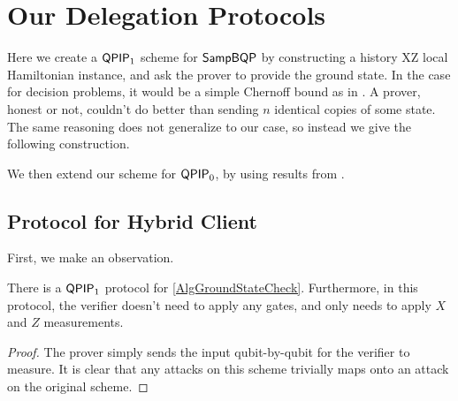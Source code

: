 \section{Our Delegation Protocols}

Here we create a $\operatorname{\mathsf{QPIP}}_1$ scheme for $\operatorname{\mathsf{SampBQP}}$ by constructing a history XZ local Hamiltonian instance, and ask the prover to provide the ground state. In the case for decision problems, it would be a simple Chernoff bound as in \cite{kitaev2002classical}. A prover, honest or not, couldn't do better than sending $n$ identical copies of some state. The same reasoning does not generalize to our case, so instead we give the following construction.

We then extend our scheme for $\operatorname{\mathsf{QPIP}}_0$, by using results from \cite{mahadev_delegation}.

\subsection{Protocol for Hybrid Client}

First, we make an observation.

\begin{observation}
	\label{ProtoGroundStateCheck}
	There is a $\operatorname{\mathsf{QPIP}}_1$ protocol for \autoref{AlgGroundStateCheck}. Furthermore, in this protocol, the verifier doesn't need to apply any gates, and only needs to apply $X$ and $Z$ measurements.
\end{observation}
\begin{proof}
	The prover simply sends the input qubit-by-qubit for the verifier to measure. It is clear that any attacks on this scheme trivially maps onto an attack on the original scheme.
\end{proof}

